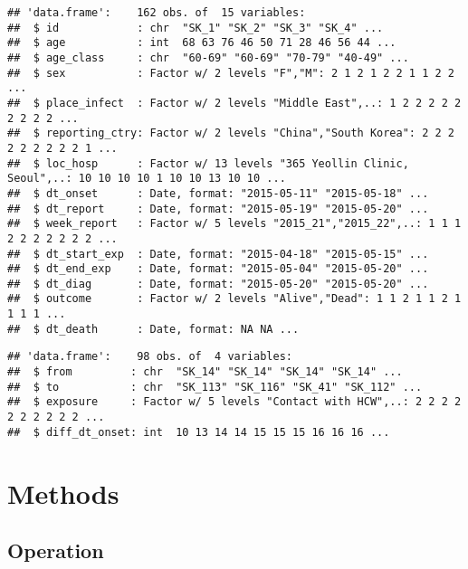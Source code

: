 \documentclass[9pt,a4paper,]{extarticle}
\newenvironment{Shaded}{\begin{snugshade}}{\end{snugshade}}
\newcommand{\KeywordTok}[1]{\textcolor[rgb]{0.13,0.29,0.53}{\textbf{#1}}}
\newcommand{\DecValTok}[1]{\textcolor[rgb]{0.00,0.00,0.81}{#1}}
\newcommand{\CommentTok}[1]{\textcolor[rgb]{0.56,0.35,0.01}{\textit{#1}}}
\newcommand{\OperatorTok}[1]{\textcolor[rgb]{0.81,0.36,0.00}{\textbf{#1}}}
\newcommand{\NormalTok}[1]{#1}
\theoremstyle{definition}
\theoremstyle{definition}
\theoremstyle{definition}
\theoremstyle{remark}
\begin{document}
\begin{verbatim}
## 'data.frame':    162 obs. of  15 variables:
##  $ id            : chr  "SK_1" "SK_2" "SK_3" "SK_4" ...
##  $ age           : int  68 63 76 46 50 71 28 46 56 44 ...
##  $ age_class     : chr  "60-69" "60-69" "70-79" "40-49" ...
##  $ sex           : Factor w/ 2 levels "F","M": 2 1 2 1 2 2 1 1 2 2 ...
##  $ place_infect  : Factor w/ 2 levels "Middle East",..: 1 2 2 2 2 2 2 2 2 2 ...
##  $ reporting_ctry: Factor w/ 2 levels "China","South Korea": 2 2 2 2 2 2 2 2 2 1 ...
##  $ loc_hosp      : Factor w/ 13 levels "365 Yeollin Clinic, Seoul",..: 10 10 10 10 1 10 10 13 10 10 ...
##  $ dt_onset      : Date, format: "2015-05-11" "2015-05-18" ...
##  $ dt_report     : Date, format: "2015-05-19" "2015-05-20" ...
##  $ week_report   : Factor w/ 5 levels "2015_21","2015_22",..: 1 1 1 2 2 2 2 2 2 2 ...
##  $ dt_start_exp  : Date, format: "2015-04-18" "2015-05-15" ...
##  $ dt_end_exp    : Date, format: "2015-05-04" "2015-05-20" ...
##  $ dt_diag       : Date, format: "2015-05-20" "2015-05-20" ...
##  $ outcome       : Factor w/ 2 levels "Alive","Dead": 1 1 2 1 1 2 1 1 1 1 ...
##  $ dt_death      : Date, format: NA NA ...
\end{verbatim}

\begin{Shaded}
\end{Shaded}

\begin{verbatim}
## 'data.frame':    98 obs. of  4 variables:
##  $ from         : chr  "SK_14" "SK_14" "SK_14" "SK_14" ...
##  $ to           : chr  "SK_113" "SK_116" "SK_41" "SK_112" ...
##  $ exposure     : Factor w/ 5 levels "Contact with HCW",..: 2 2 2 2 2 2 2 2 2 2 ...
##  $ diff_dt_onset: int  10 13 14 14 15 15 15 16 16 16 ...
\end{verbatim}

\section{Methods}\label{methods}

\subsection{Operation}\label{operation}
\end{document}
